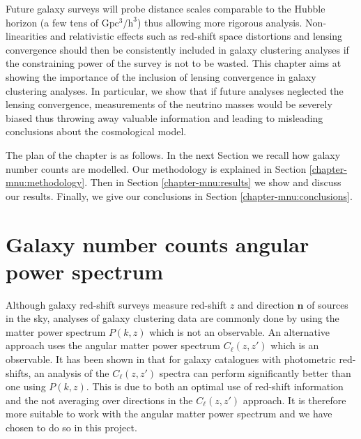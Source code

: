 Future galaxy surveys will probe distance scales comparable to the Hubble horizon (a few tens of $\mathrm{Gpc^3/h^3}$) thus allowing more rigorous analysis. Non-linearities and relativistic effects such as red-shift space distortions and lensing convergence should then be consistently included in galaxy clustering analyses if the constraining power of the survey is not to be wasted. This chapter aims at showing the importance of the inclusion of lensing convergence in galaxy clustering analyses. In particular, we show that if future analyses neglected the lensing convergence, measurements of the neutrino masses would be severely biased thus throwing away valuable information and leading to misleading conclusions about the cosmological model. 

The plan of the chapter is as follows. In the next Section we recall how galaxy number counts are modelled. Our methodology is explained in Section \ref{chapter-mnu:methodology}. Then in Section \ref{chapter-mnu:results} we show and discuss our results. Finally, we give our conclusions in Section \ref{chapter-mnu:conclusions}.

\section{Galaxy number counts angular power spectrum}
\label{chapter-mnu:modelling}

Although galaxy red-shift surveys measure red-shift $z$ and direction $\mathbf{n}$ of sources in the sky, analyses of galaxy clustering data are commonly done by using the matter power spectrum $P(k,z)$ \cite{Feldman:1993ky} which is not an observable. An alternative approach uses the angular matter power spectrum $C_\ell(z,z')$ which is an observable. It has been shown in \cite{DiDio:2013sea} that for galaxy catalogues with photometric red-shifts, an analysis of the $C_\ell(z,z')$ spectra can perform significantly better than one using $P(k,z)$. This is due to both an optimal use of red-shift information and the not averaging over directions in the $C_\ell(z,z')$ approach. It is therefore more suitable to work with the angular matter power spectrum and we have chosen to do so in this project.  

